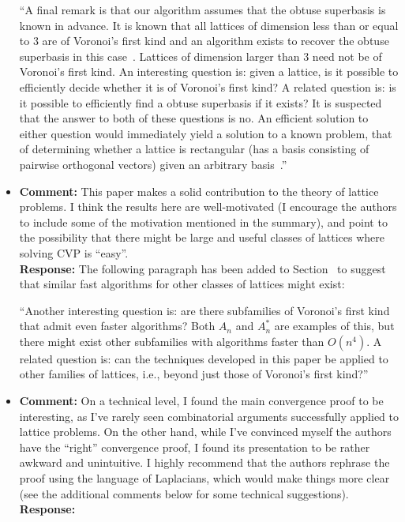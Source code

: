 \documentclass[a4paper,10pt]{article}
\begin{document}
\begin{itemize}
``A final remark is that our algorithm assumes that the obtuse superbasis is known in advance.  It is known that all lattices of dimension less than or equal to 3 are of Voronoi's first kind and an algorithm exists to recover the obtuse superbasis in this case~\cite{SPLAG}.  Lattices of dimension larger than 3 need not be of Voronoi's first kind.  An interesting question is: given a lattice, is it possible to efficiently decide whether it is of Voronoi's first kind?  A related question is: is it possible to efficiently find a obtuse superbasis if it exists?  It is suspected that the answer to both of these questions is no.  An efficient solution to either question would immediately yield a solution to a known problem, that of determining whether a lattice is rectangular (has a basis consisting of pairwise orthogonal vectors) given an arbitrary basis~\cite{Lenstra_Silverberg_revisting_gentra_szydlo_2014}.''


\item\textbf{Comment:} 
This paper makes a solid contribution to the theory of lattice problems. I think the results here are
well-motivated (I encourage the authors to include some of the motivation mentioned in the summary), and point to the possibility that there might be large and useful classes of lattices where
solving CVP is “easy”.
\\\textbf{Response:}
The following paragraph has been added to Section~ to suggest that similar fast algorithms for other classes of lattices might exist:

``Another interesting question is: are there subfamilies of Voronoi's first kind that admit even faster algorithms?  Both $A_n$ and $A_n^*$ are examples of this, but there might exist other subfamilies with algorithms faster than $O(n^4)$.  A related question is: can the techniques developed in this paper be applied to other families of lattices, i.e., beyond just those of Voronoi's first kind?''


\item\textbf{Comment:} 
On a technical level, I found the main convergence proof to be interesting, as I’ve rarely seen
combinatorial arguments successfully applied to lattice problems. On the other hand, while I’ve
convinced myself the authors have the ``right'' convergence proof, I found its presentation to be
rather awkward and unintuitive. I highly recommend that the authors rephrase the proof using
the language of Laplacians, which would make things more clear (see the additional comments
below for some technical suggestions).
\\\textbf{Response:}

\end{itemize}
\end{document}
